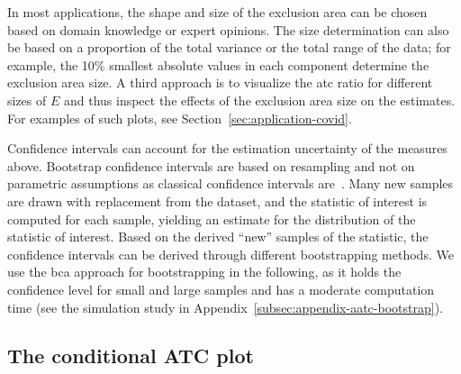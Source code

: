 \documentclass[pdflatex]{sn-jnl}
\theoremstyle{plain}%
\theoremstyle{definition}
\begin{document}
In most applications, the shape and size of the exclusion area can be chosen based on domain knowledge or expert opinions.
The size determination can also be based on a proportion of the total variance or the total range of the data; for example, the 10\% smallest absolute values in each component determine the exclusion area size.
A third approach is to visualize the \ac{atc} ratio for different sizes of $E$ and thus inspect the effects of the exclusion area size on the estimates.
For examples of such plots, see Section~\ref{sec:application-covid}.

Confidence intervals can account for the estimation uncertainty of the measures above.
Bootstrap confidence intervals are based on resampling and not on parametric assumptions as classical confidence intervals are~\parencite[for introductions see][]{Hesterberg2011, Bittmann2021}.
Many new samples are drawn with replacement from the dataset, and the statistic of interest is computed for each sample, yielding an estimate for the distribution of the statistic of interest.
Based on the derived \enquote{new} samples of the statistic, the confidence intervals can be derived through different bootstrapping methods.
We use the \ac{bca} approach for bootstrapping in the following, as it holds the confidence level for small and large samples and has a moderate computation time (see the simulation study in Appendix~\ref{subsec:appendix-aatc-bootstrap}).


\subsection{The conditional ATC plot}\label{subsec:aatc-cond-prob}
\end{document}
